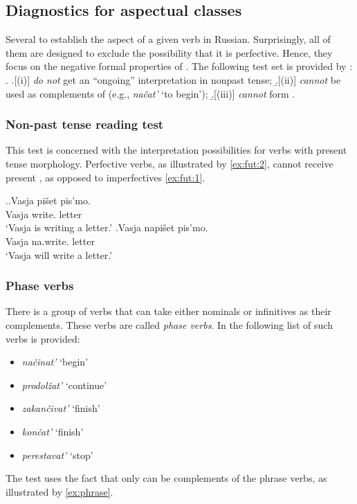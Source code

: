\subsection{Diagnostics for aspectual classes}\label{sec:tests:old}
Several  to establish the aspect of a given verb in Russian. Surprisingly, all of them are designed to exclude the possibility that it is perfective. Hence, they focus on the negative formal properties of . The following test set is provided by \citet{Schoorlemmer:95}: 
\ex.\label{tests} \a.[(i)] \label{sttest1}  \textit{do not} get an ``ongoing'' interpretation in nonpast tense; 
\b.[(ii)] \label{sttest2}  \textit{cannot} be used as complements of  (e.g., \textit{na\v{c}at'} `to begin'); 
\b.[(iii)] \label{sttest3}  \textit{cannot} form .

\subsubsection{Non-past tense reading test}
This test is concerned with the interpretation possibilities for verbs with present tense morphology. Perfective verbs, as illustrated by \ref{ex:fut:2}, cannot receive present , as opposed to imperfectives \ref{ex:fut:1}.

\ex.\label{ex:fut}\ag.\label{ex:fut:1}Vasja pi\v{s}et\textsuperscript{\IPF} pis'mo.\\
Vasja write. letter\\
`Vasja is writing a letter.'
\bg.\label{ex:fut:2}Vasja napi\v{s}et\textsuperscript{\PF} pis'mo.\\
Vasja na.write. letter\\
`Vasja will write a letter.'
 
\subsubsection{Phase verbs}
There is a group of verbs that can take either nominals or infinitives as their complements. These verbs are called \textit{phase verbs}. In \cite{Borik:02} the following list of such verbs is provided:
\begin{itemize}[noitemsep]
\item \textit{na\v{c}inat'} `begin'
\item \textit{prodol\v{z}at'} `continue'
\item \textit{zakan\v{c}ivat'} `finish'
\item \textit{kon\v{c}at'} `finish'
\item \textit{perestavat'} `stop'
\end{itemize}
The test uses the fact that only  can be complements of the phrase verbs, as illustrated by \ref{ex:phrase}.

